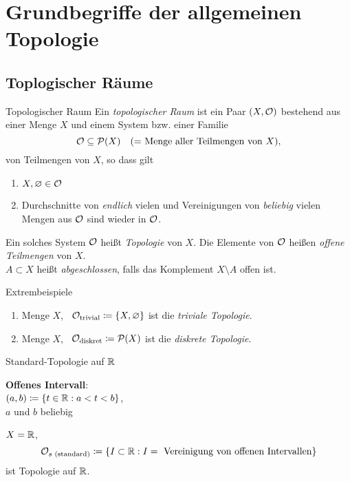 \chapter{Grundbegriffe der allgemeinen Topologie}

\section{Toplogischer Räume}

\begin{definition}{Topologischer Raum}
  Ein \emph{topologischer Raum} ist ein Paar $ (X, \mathcal{O}) $ bestehend aus einer Menge $ X $ und einem System bzw. einer Familie 
  \begin{equation*}
    \mathcal{O} \subseteq \mathcal{P}(X) \quad \text{(= Menge aller Teilmengen von $ X $),}
  \end{equation*}
  von Teilmengen von $ X $, so dass gilt
  \begin{enumerate}
    \item $ X, \varnothing \in \mathcal{O} $ 
    \item Durchschnitte von \emph{endlich} vielen und Vereinigungen von \emph{beliebig} vielen Mengen aus $ \mathcal{O} $ sind wieder in $ \mathcal{O} $.
  \end{enumerate}
  Ein solches System $ \mathcal{O} $ heißt \emph{Topologie} von $ X $. Die Elemente von $ \mathcal{O} $ heißen \emph{offene Teilmengen} von $ X $. \\
  $ A \subset X $ heißt \emph{abgeschlossen}, falls das Komplement $ X \setminus A $ offen ist.
\end{definition}

\begin{example}{Extrembeispiele}
  \begin{enumerate}
    \item Menge $ X $, \ $ \mathcal{O}_\text{trivial} \coloneqq \{ X, \varnothing \} $ ist die \emph{triviale Topologie}.
    \item Menge $ X $, \ $ \mathcal{O}_\text{diskret} \coloneqq \mathcal{P}(X) $ ist die \emph{diskrete Topologie}.
  \end{enumerate}
\end{example}

\begin{example}{Standard-Topologie auf $ \mathbb{R} $}
  \begin{marginfigure}[4em]
    \textbf{Offenes Intervall}: \\ $ (a,b) \coloneqq \{  t \in \mathbb{R} : a < t < b \} $, \\ $ a $ und $ b $ beliebig
  \end{marginfigure}
  $ X = \mathbb{R} $,
  \begin{equation*}
    \mathcal{O}_{s \text{ (standard)}} \coloneqq \{ I \subset \mathbb{R} : I = \text{ Vereinigung von offenen Intervallen} \}
  \end{equation*}
  ist Topologie auf $ \mathbb{R} $.
\end{example}

